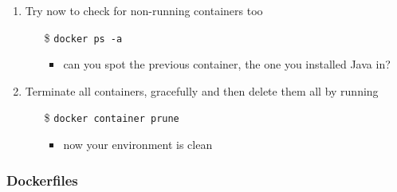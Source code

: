 \documentclass{beamer}\mode<presentation>{\usetheme{AMSBolognaFC}}
\begin{document}
\begin{frame}[allowframebreaks]
\begin{enumerate}
        \item Try now to check for non-running containers too
        \begin{itemize}
            \item[\$] \texttt{docker ps \alert{-a}}
            \begin{itemize}
                \item can you spot the previous container, the one you installed Java in?
            \end{itemize}
        \end{itemize}

        \item Terminate all containers, gracefully and then delete them all by running
        \begin{itemize}
            \item[\$] \texttt{docker container \alert{prune}}
            \begin{itemize}
                \item now your environment is clean
            \end{itemize}
        \end{itemize}

    \end{enumerate}

\end{frame}

\subsubsection{Dockerfiles}
\end{document}
